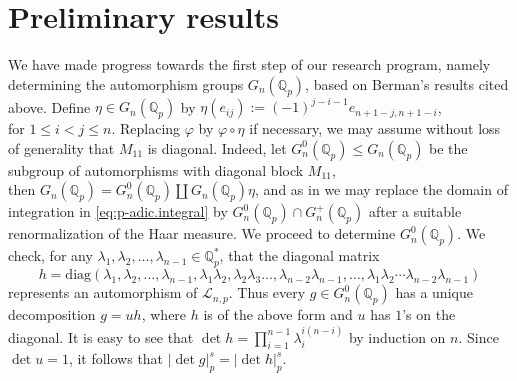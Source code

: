 \documentclass[12pt]{article}
\begin{document}
\section{Preliminary results}
\label{preliminary.results}
We have made progress towards the first step of our research program, namely determining the automorphism groups $G_{n}(\mathbb{Q}_p)$, based on Berman's results cited above.
Define $\eta\in{G_{n}(\mathbb{Q}_p)}$ by $\eta(e_{ij}):=(-1)^{j-i-1}e_{n+1-j,n+1-i}$,\\ for $1\leq{i}<{j}\leq{n}$. Replacing $\varphi$ by $\varphi\circ\eta$ if necessary, we may assume without loss of generality that $M_{11}$ is diagonal. Indeed, let $G_{n}^{0}(\mathbb{Q}_{p})\leq{G_{n}(\mathbb{Q}_{p})}$ be the subgroup of automorphisms with diagonal block $M_{11}$,\\ then $G_{n}(\mathbb{Q}_{p})=G_{n}^{0}(\mathbb{Q}_{p})\coprod{G_{n}(\mathbb{Q}_{p})}\eta$, and as in \cite[Proposition 2.1]{DuSautoyLubotzky} we may replace the domain of integration in \eqref{eq:p-adic.integral} by $G_{n}^{0}(\mathbb{Q}_{p})\cap{G_{n}^{+}(\mathbb{Q}_{p})}$ after a suitable renormalization of the Haar measure. We proceed to determine $G_{n}^{0}(\mathbb{Q}_{p})$.
We check, for any $\lambda_{1},\lambda_{2},\dots,\lambda_{n-1}\in\mathbb{Q}_{p}^{\ast}$, that the diagonal matrix \[h=\mathrm{diag}(\lambda_{1},\lambda_{2},\dots,\lambda_{n-1},\lambda_{1}\lambda_{2},\lambda_{2}\lambda_{3}\dots,\lambda_{n-2}\lambda_{n-1},\dots,\lambda_{1}\lambda_{2}\cdots\lambda_{n-2}\lambda_{n-1})\]
represents an automorphism of $\mathcal{L}_{n,p}$. Thus every $g\in{G_{n}^{0}(\mathbb{Q}_{p})}$ has a unique decomposition $g=uh$, where $h$ is of the above form and $u$ has $1$'s on the diagonal. It is easy to see that $\det{h}=\prod_{i=1}^{n-1}\lambda_i^{i(n-i)}$ by induction on $n$. Since $\det{u}=1$, it follows that $|\det{g}|_{p}^{s}=|\det{h}|_{p}^{s}$.
\end{document}
